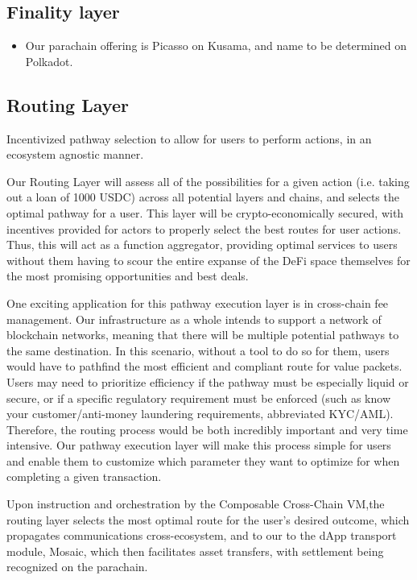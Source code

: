 \subsection{Finality layer}

\begin{itemize}
        \item Our parachain offering is Picasso on Kusama, and name to be determined on Polkadot.
\end{itemize}

\subsection{Routing Layer}

Incentivized pathway selection to allow for users to perform actions, in an ecosystem agnostic manner.

Our Routing Layer will assess all of the possibilities for a given action (i.e. taking out a loan of 1000 USDC) across all potential layers and chains, and selects the optimal pathway for a user. This layer will be crypto-economically secured, with incentives provided for actors to properly select the best routes for user actions. Thus, this will act as a function aggregator, providing optimal services to users without them having to scour the entire expanse of the DeFi space themselves for the most promising opportunities and best deals.

One exciting application for this pathway execution layer is in cross-chain fee management. Our infrastructure as a whole intends to support a network of blockchain networks, meaning that there will be multiple potential pathways to the same destination. In this scenario, without a tool to do so for them, users would have to pathfind the most efficient and compliant route for value packets. Users may need to prioritize efficiency if the pathway must be especially liquid or secure, or if a specific regulatory requirement must be enforced (such as know your customer/anti-money laundering requirements, abbreviated KYC/AML). Therefore, the routing process would be both incredibly important and very time intensive. Our pathway execution layer will make this process simple for users and enable them to customize which parameter they want to optimize for when completing a given transaction.

Upon instruction and orchestration by the Composable Cross-Chain VM,the routing layer selects the most optimal route for the user’s desired outcome, which propagates communications cross-ecosystem, and to our to the dApp transport module, Mosaic, which then facilitates asset transfers, with settlement being recognized on the parachain.

